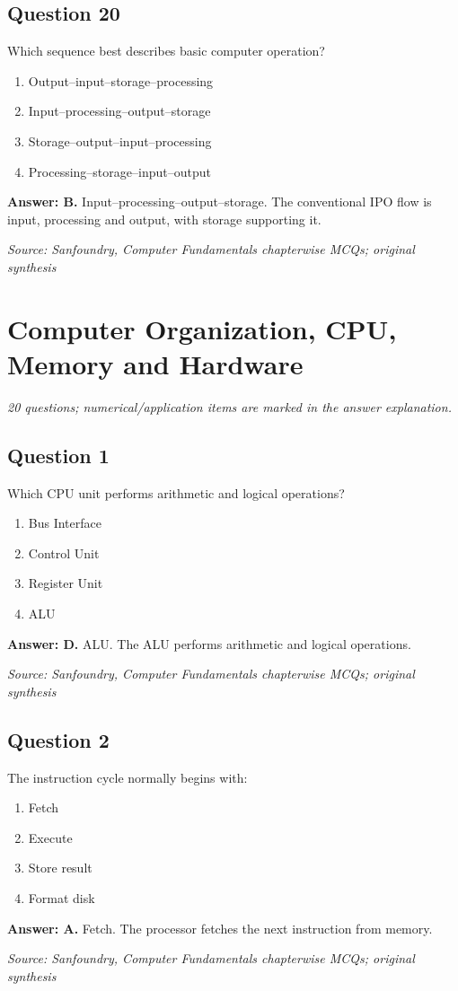 \documentclass[11pt,a4paper]{book}
\newcommand{\source}[1]{\par\smallskip\textit{Source: #1}}
\newcommand{\answer}[2]{\par\textbf{Answer: #1.} #2}
\begin{document}
\section*{Question 20}
Which sequence best describes basic computer operation?
\begin{enumerate}[label=\Alph*.]
\item Output–input–storage–processing
\item Input–processing–output–storage
\item Storage–output–input–processing
\item Processing–storage–input–output
\end{enumerate}
\answer{B}{Input–processing–output–storage. The conventional IPO flow is input, processing and output, with storage supporting it.}
\source{Sanfoundry, Computer Fundamentals chapterwise MCQs; original synthesis}

\chapter{Computer Organization, CPU, Memory and Hardware}
\textit{20 questions; numerical/application items are marked in the answer explanation.}
\section*{Question 1}
Which CPU unit performs arithmetic and logical operations?
\begin{enumerate}[label=\Alph*.]
\item Bus Interface
\item Control Unit
\item Register Unit
\item ALU
\end{enumerate}
\answer{D}{ALU. The ALU performs arithmetic and logical operations.}
\source{Sanfoundry, Computer Fundamentals chapterwise MCQs; original synthesis}
\section*{Question 2}
The instruction cycle normally begins with:
\begin{enumerate}[label=\Alph*.]
\item Fetch
\item Execute
\item Store result
\item Format disk
\end{enumerate}
\answer{A}{Fetch. The processor fetches the next instruction from memory.}
\source{Sanfoundry, Computer Fundamentals chapterwise MCQs; original synthesis}
\end{document}
